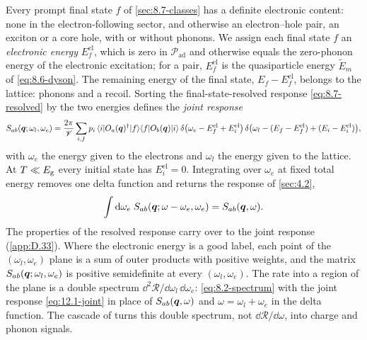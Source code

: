 Every prompt final state $f$ of \cref{sec:8.7-classes} has a definite electronic content: none in the electron-following sector, and otherwise an electron--hole pair, an exciton or a core hole, with or without phonons. We assign each final state $f$ an \emph{electronic energy} $E^{\mathrm{el}}_f$, which is zero in $\mathcal{P}_{\mathrm{ad}}$ and otherwise equals the zero-phonon energy of the electronic excitation; for a pair, $E^{\mathrm{el}}_f$ is the quasiparticle energy $\tilde E_m$ of \cref{eq:8.6-dyson}. The remaining energy of the final state, $E_f - E^{\mathrm{el}}_f$, belongs to the lattice: phonons and a recoil. Sorting the final-state-resolved response \cref{eq:8.7-resolved} by the two energies defines the \emph{joint response}
\begin{equation}
  S_{ab}(\bm{q};\omega_l,\omega_e) = \frac{2\pi}{\mathscr{V}}\sum_{i,f}p_i\,\langle i|O_a(\bm{q})^\dagger|f\rangle\langle f|O_b(\bm{q})|i\rangle\,
  \delta\bigl(\omega_e - E^{\mathrm{el}}_f + E^{\mathrm{el}}_i\bigr)\,\delta\bigl(\omega_l - (E_f - E^{\mathrm{el}}_f) + (E_i - E^{\mathrm{el}}_i)\bigr) ,
  \label{eq:12.1-joint}
\end{equation}
with $\omega_e$ the energy given to the electrons and $\omega_l$ the energy given to the lattice. At $T \ll E_{\mathrm{g}}$ every initial state has $E^{\mathrm{el}}_i = 0$. Integrating over $\omega_e$ at fixed total energy removes one delta function and returns the response of \cref{sec:4.2},
\begin{equation}
  \int\mathrm{d}\omega_e\;S_{ab}(\bm{q};\omega - \omega_e,\omega_e) = S_{ab}(\bm{q},\omega) .
  \label{eq:12.1-marginal}
\end{equation}
The properties of the resolved response carry over to the joint response (\cref{app:D.33}). Where the electronic energy is a good label, each point of the $(\omega_l, \omega_e)$ plane is a sum of outer products with positive weights, and the matrix $S_{ab}(\bm{q};\omega_l,\omega_e)$ is positive semidefinite at every $(\omega_l, \omega_e)$. The rate into a region of the plane is a double spectrum $\dd^2\mathcal{R}/\dd\omega_l\,\dd\omega_e$: \cref{eq:8.2-spectrum} with the joint response \cref{eq:12.1-joint} in place of $S_{ab}(\bm{q},\omega)$ and $\omega = \omega_l + \omega_e$ in the delta function. The cascade of  turns this double spectrum, not $\dd\mathcal{R}/\dd\omega$, into charge and phonon signals.

